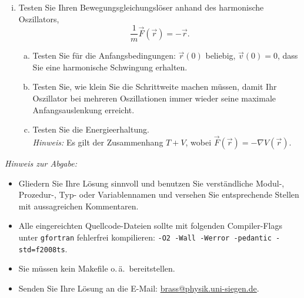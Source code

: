 \begin{question}[subtitle=Euler-Verfahren]
\begin{enumerate}[(i)]
  \item Testen Sie Ihren Bewegungsgleichungslöser anhand des harmonische Oszillators,
    \begin{equation}
      \label{eq:7}
      \frac{1}{m} \vec{F}(\vec{r}) = - \vec{r}.
    \end{equation}
    \begin{enumerate}[a)]
    \item Testen Sie für die Anfangsbedingungen: $\vec{r}(0)$ beliebig, $\vec{v}(0) = 0$, dass Sie eine harmonische Schwingung erhalten.
    \item Testen Sie, wie klein Sie die Schrittweite machen müssen, damit Ihr Oszillator bei mehreren Oszillationen immer wieder seine maximale Anfangsauslenkung erreicht.
    \item Testen Sie die Energieerhaltung.\\
      \textit{Hinweis:} Es gilt der Zusammenhang $T + V$, wobei $\vec{F}(\vec{r}) = - ∇V(\vec{r})$.
    \end{enumerate}
  \end{enumerate}
\end{question}

\textit{Hinweis zur Abgabe:}
\begin{itemize}
\item Gliedern Sie Ihre Lösung sinnvoll und benutzen Sie verständliche Modul-, Prozedur-, Typ- oder Variablennamen und versehen Sie entsprechende Stellen mit aussagreichen Kommentaren.
\item Alle eingereichten Quellcode-Dateien sollte mit folgenden Compiler-Flags unter \verb|gfortran| fehlerfrei kompilieren: \verb|-O2 -Wall -Werror -pedantic -std=f2008ts|.
\item Sie müssen kein Makefile o.\,ä.\ bereitstellen.
\item Senden Sie Ihre Lösung an die E-Mail: \url{brass@physik.uni-siegen.de}.
\end{itemize}

